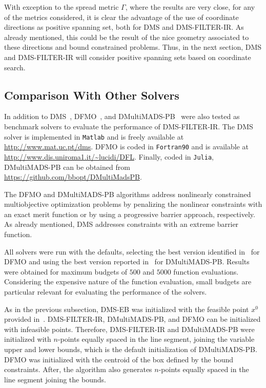 \documentclass[12pt]{article}
\begin{document}
With exception to the spread metric $\Gamma$, where the results
are very close, for any of the metrics considered, it is clear the
advantage of the use of coordinate directions as positive spanning
set, both for DMS and DMS-FILTER-IR. As already mentioned, this
could be the result of the nice geometry associated to these
directions and bound constrained problems. Thus, in the next
section, DMS and DMS-FILTER-IR will consider positive spanning
sets based on coordinate search.

\subsection{Comparison With Other Solvers}
In addition to DMS~\cite{custodio2011}, DFMO~\cite{liuzzi2016},
and DMultiMADS-PB~\cite{bigeon2022} were also tested as benchmark
solvers to evaluate the performance of DMS-FILTER-IR. The DMS
solver is implemented in {\tt Matlab} and is freely available at
\url{http://www.mat.uc.pt/dms}. DFMO is coded in {\tt Fortran90}
and is available at \url{http://www.dis.uniroma1.it/~lucidi/DFL}.
Finally, coded in {\tt Julia}, DMultiMADS-PB can be obtained from
\url{https://github.com/bbopt/DMultiMadsPB}.

The DFMO and DMultiMADS-PB algorithms address nonlinearly
constrained multiobjective optimization problems by penalizing the
nonlinear constraints with an exact merit function or by using a
progressive barrier approach, respectively. As already mentioned,
DMS addresses constraints with an extreme barrier function.

All solvers were run with the defaults, selecting the best version
identified in~\cite{liuzzi2016} for DFMO and using the best
version reported in~\cite{bigeon2022} for DMultiMADS-PB. Results
were obtained for maximum budgets of $500$ and $5000$ function
evaluations. Considering the expensive nature of the function
evaluation, small budgets are particular relevant for evaluating
the performance of the solvers.

As in the previous subsection, DMS-EB was initialized with the
feasible point $x^0$ provided in~\cite{karmitsa}. DMS-FILTER-IR,
DMultiMADS-PB, and DFMO can be initialized with infeasible points.
Therefore, DMS-FILTER-IR and DMultiMADS-PB were initialized with
$n$-points equally spaced in the line segment, joining the
variable upper and lower bounds, which is the default
initialization of DMultiMADS-PB. DFMO was initialized with the
centroid of the box defined by the bound constraints. After, the
algorithm also generates $n$-points equally spaced in the line
segment joining the bounds.
\end{document}
